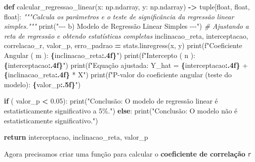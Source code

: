 \documentclass[
]{book}
\newenvironment{Shaded}{\begin{snugshade}}{\end{snugshade}}
\newcommand{\BuiltInTok}[1]{#1}
\newcommand{\CommentTok}[1]{\textcolor[rgb]{0.56,0.35,0.01}{\textit{#1}}}
\newcommand{\ControlFlowTok}[1]{\textcolor[rgb]{0.13,0.29,0.53}{\textbf{#1}}}
\newcommand{\FloatTok}[1]{\textcolor[rgb]{0.00,0.00,0.81}{#1}}
\newcommand{\KeywordTok}[1]{\textcolor[rgb]{0.13,0.29,0.53}{\textbf{#1}}}
\newcommand{\NormalTok}[1]{#1}
\newcommand{\OperatorTok}[1]{\textcolor[rgb]{0.81,0.36,0.00}{\textbf{#1}}}
\newcommand{\SpecialCharTok}[1]{\textcolor[rgb]{0.81,0.36,0.00}{\textbf{#1}}}
\newcommand{\SpecialStringTok}[1]{\textcolor[rgb]{0.31,0.60,0.02}{#1}}
\newcommand{\StringTok}[1]{\textcolor[rgb]{0.31,0.60,0.02}{#1}}
\begin{document}
\begin{Shaded}
\begin{Highlighting}[]
\KeywordTok{def}\NormalTok{ calcular\_regressao\_linear(x: np.ndarray, y: np.ndarray) }\OperatorTok{{-}\textgreater{}} \BuiltInTok{tuple}\NormalTok{[}\BuiltInTok{float}\NormalTok{, }\BuiltInTok{float}\NormalTok{, }\BuiltInTok{float}\NormalTok{]:}
    \CommentTok{"""Calcula os parâmetros e o teste de significância da regressão linear simples."""}
    \BuiltInTok{print}\NormalTok{(}\StringTok{"{-}{-}{-} b) Modelo de Regressão Linear Simples {-}{-}{-}"}\NormalTok{)}
    \CommentTok{\# Ajustando a reta de regressão e obtendo estatísticas completas}
\NormalTok{    inclinacao\_reta, interceptacao, correlacao\_r, valor\_p, erro\_padrao }\OperatorTok{=}\NormalTok{ stats.linregress(x, y)}
    \BuiltInTok{print}\NormalTok{(}\SpecialStringTok{f"Coeficiente Angular ( m ): }\SpecialCharTok{\{}\NormalTok{inclinacao\_reta}\SpecialCharTok{:.4f\}}\SpecialStringTok{"}\NormalTok{)}
    \BuiltInTok{print}\NormalTok{(}\SpecialStringTok{f"Intercepto ( n ): }\SpecialCharTok{\{}\NormalTok{interceptacao}\SpecialCharTok{:.4f\}}\SpecialStringTok{"}\NormalTok{)}
    \BuiltInTok{print}\NormalTok{(}\SpecialStringTok{f"Equação ajustada: Y\_hat = }\SpecialCharTok{\{}\NormalTok{interceptacao}\SpecialCharTok{:.4f\}}\SpecialStringTok{ + }\SpecialCharTok{\{}\NormalTok{inclinacao\_reta}\SpecialCharTok{:.4f\}}\SpecialStringTok{ * X"}\NormalTok{)}
    \BuiltInTok{print}\NormalTok{(}\SpecialStringTok{f"P{-}valor do coeficiente angular (teste do modelo): }\SpecialCharTok{\{}\NormalTok{valor\_p}\SpecialCharTok{:.5f\}}\SpecialStringTok{"}\NormalTok{)}

    \ControlFlowTok{if}\NormalTok{ ( valor\_p }\OperatorTok{\textless{}} \FloatTok{0.05}\NormalTok{):}
        \BuiltInTok{print}\NormalTok{(}\StringTok{"Conclusão: O modelo de regressão linear é estatisticamente significativo a 5\%."}\NormalTok{)}
    \ControlFlowTok{else}\NormalTok{:}
        \BuiltInTok{print}\NormalTok{(}\StringTok{"Conclusão: O modelo não é estatisticamente significativo."}\NormalTok{)}

    \ControlFlowTok{return}\NormalTok{ interceptacao, inclinacao\_reta, valor\_p}
\end{Highlighting}
\end{Shaded}

Agora precisamos criar uma função para calcular o \textbf{coeficiente de
correlação} \texttt{r}
\end{document}
